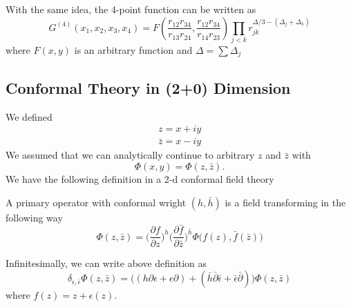 \documentclass[a4paper,11pt]{article}
\begin{document}
With the same idea, the 4-point function can be written as
\begin{equation}
    G^{(4)}(x_1,x_2,x_3,x_4)=F(\frac{r_{12}r_{34}}{r_{13}r_{24}},\frac{r_{12}r_{34}}{r_{14}r_{23}})\prod_{j<k}r_{jk}^{\Delta/3-(\Delta_j+\Delta_k)}
\end{equation}
where $F(x,y)$ is an arbitrary function and $\Delta=\sum\Delta_j$
\subsection{Conformal Theory in (2+0) Dimension}
We defined 
\begin{equation}
\begin{aligned}
    z=x+iy\\
    \bar{z}=x-iy
\end{aligned}
\end{equation}
We assumed that we can analytically continue to arbitrary $z$ and $\bar{z}$ with
\begin{equation}
\Phi(x,y)=\Phi(z,\bar{z}).
\end{equation}
We have the following definition in a 2-d conformal field theory
\begin{framed}
A primary operator with conformal wright $(h,\bar{h})$ is a field transforming in the following way
\begin{equation*}
    \Phi(z,\bar{z})=\bigg(\frac{\partial f}{\partial z}\bigg)^h\bigg(\frac{\partial\bar{f}}{\partial\bar{z}}\bigg)^{\bar{h}}\Phi\big(f(z),\bar{f}(\bar{z})\big)
\end{equation*}
\end{framed}

Infinitesimally, we can write above definition as 
\begin{equation}
    \delta_{\epsilon,\bar{\epsilon}}\Phi(z,\bar{z})=\bigg((h\partial\epsilon+\epsilon\partial)+(\bar{h}\bar{\partial}\bar{\epsilon}+\bar{\epsilon}\bar{\partial})\bigg)\Phi(z,\bar{z})
\end{equation}
where $f(z)=z+\epsilon(z)$. 
\end{document}

